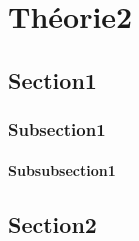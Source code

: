 \chapter{Théorie2}
\section{Section1}
\subsection{Subsection1}
\subsubsection{Subsubsection1}
\lipsum[1-3]
\section{Section2}